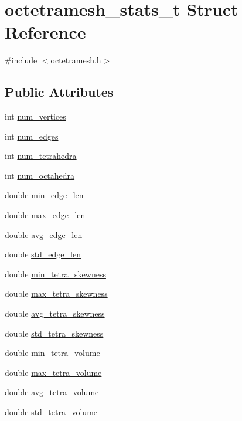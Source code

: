 \hypertarget{structoctetramesh__stats__t}{
\section{octetramesh\_\-stats\_\-t Struct Reference}
\label{structoctetramesh__stats__t}
}


{\ttfamily \#include $<$octetramesh.h$>$}

\subsection*{Public Attributes}
\begin{DoxyCompactItemize}
\item 
int \hyperlink{structoctetramesh__stats__t_aff5d5db9a58aed02ea181ea8ea427194}{num\_\-vertices}
\item 
int \hyperlink{structoctetramesh__stats__t_adad7ec9d444f215c9e3977d5d8527772}{num\_\-edges}
\item 
int \hyperlink{structoctetramesh__stats__t_ab49ea400e5ffea621a587c9a98f0d598}{num\_\-tetrahedra}
\item 
int \hyperlink{structoctetramesh__stats__t_aa2b0e4d87a464786cb5f49b355897fae}{num\_\-octahedra}
\item 
double \hyperlink{structoctetramesh__stats__t_a58cd1dc3060e7484a760cb00a4c9831e}{min\_\-edge\_\-len}
\item 
double \hyperlink{structoctetramesh__stats__t_a561ac510e2dc56e169d230b7462bc0c6}{max\_\-edge\_\-len}
\item 
double \hyperlink{structoctetramesh__stats__t_a17af1fd993f2b5e989e1a1a60bedb724}{avg\_\-edge\_\-len}
\item 
double \hyperlink{structoctetramesh__stats__t_a85257916d394fbdf90eabb1d302e3f26}{std\_\-edge\_\-len}
\item 
double \hyperlink{structoctetramesh__stats__t_a14e27d90fdd3e92924e69922ee6a9a92}{min\_\-tetra\_\-skewness}
\item 
double \hyperlink{structoctetramesh__stats__t_adf24bef843b7d2c7c848d3a190484f0e}{max\_\-tetra\_\-skewness}
\item 
double \hyperlink{structoctetramesh__stats__t_aad26b465bf205cb20b5eb30a034eb53c}{avg\_\-tetra\_\-skewness}
\item 
double \hyperlink{structoctetramesh__stats__t_a672abad586d95e7b1fb17f75ea9c383e}{std\_\-tetra\_\-skewness}
\item 
double \hyperlink{structoctetramesh__stats__t_aa77c2b6093b2821711050d2e90ba8942}{min\_\-tetra\_\-volume}
\item 
double \hyperlink{structoctetramesh__stats__t_ae0461fd75f69baebc709a925302080de}{max\_\-tetra\_\-volume}
\item 
double \hyperlink{structoctetramesh__stats__t_a72b15fcae3f9d7774e7c88d4bbcc00d3}{avg\_\-tetra\_\-volume}
\item 
double \hyperlink{structoctetramesh__stats__t_aed7222523a5549a19e64be1ba55cbf96}{std\_\-tetra\_\-volume}
\end{DoxyCompactItemize}


